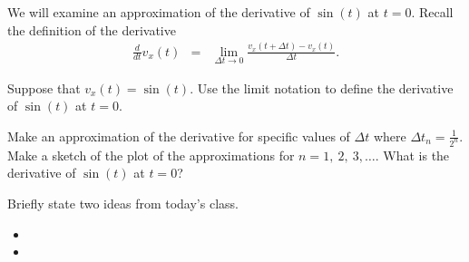 \begin{problem}
\begin{subproblem}
  \end{subproblem}

  \clearpage

\item We will examine an approximation of the derivative of $\sin(t)$
  at $t=0$.  Recall the definition of the derivative
  \begin{eqnarray*}
    \frac{d}{dt} v_x(t) & = & \lim_{\Delta t \rightarrow 0}
                              \frac{v_x(t+\Delta t) - v_x(t)}{\Delta t}.
  \end{eqnarray*}
  \begin{subproblem}
  \item Suppose that $v_x(t)=\sin(t)$. Use the limit notation to
    define the derivative of $\sin(t)$ at $t=0$.
    \vspace{6em}
  \item Make an approximation of the derivative for specific values of
    $\Delta t$ where $\Delta t_n=\frac{1}{2^n}$. Make a sketch of the
    plot of the approximations for $n=1,~2,~3,\ldots$. What is the
    derivative of $\sin(t)$ at $t=0$?
    \vfill
  \end{subproblem}

\end{problem}

\postClass

\begin{problem}
\item Briefly state two ideas from today's class.
  \begin{itemize}
  \item
  \item
  \end{itemize}
\item
  \begin{subproblem}
    \item
  \end{subproblem}
\end{problem}


